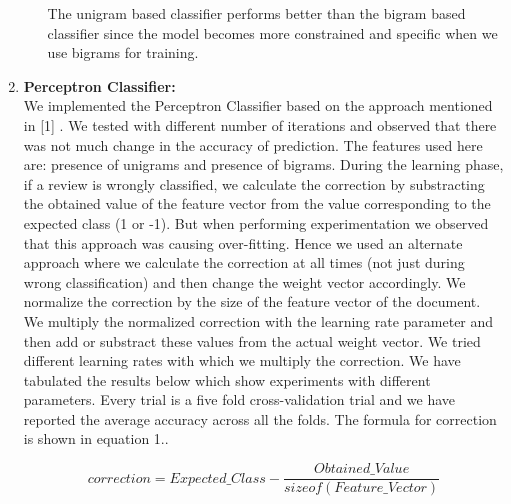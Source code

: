\documentclass[11pt,a4paper]{article}
\begin{document}
\begin{enumerate}
\begin{enumerate}
\begin{center}
\begin{tabular}{|c|c|c|}
				\end{tabular} 
			\end{center}
The unigram based classifier performs better than the bigram based classifier since the model becomes more constrained and specific when we use bigrams for training.
			
			
		\end{enumerate}

		\clearpage
		
				\item
		{\bf Perceptron Classifier:}\\
			 We implemented the Perceptron Classifier based on the approach mentioned in [1] . We tested with different number of iterations and observed that there was not much change in the accuracy of prediction. The features used here are: presence of unigrams and presence of bigrams. During the learning phase, if a review is wrongly classified, we calculate the correction by substracting the obtained value of the feature vector from the value corresponding to the expected class (1 or -1). But when performing experimentation we observed that this approach was causing over-fitting. Hence we used an alternate approach where we calculate the correction at all times (not just during wrong classification) and then change the weight vector accordingly. We normalize the correction by the size of the feature vector of the document. We multiply the normalized correction with the learning rate parameter and then add or substract these values from the actual weight vector. We tried different learning rates with which we multiply the correction. We have tabulated the results below which show experiments with different parameters. Every trial is a five fold cross-validation trial and we have reported the average accuracy across all the folds. The formula for correction is shown in equation 1..
			
			 \begin{equation}
			 correction=Expected\_Class - {\frac{Obtained\_Value} {sizeof(Feature\_Vector)}}
			 \end{equation}
			 

\end{enumerate}
\end{document}
